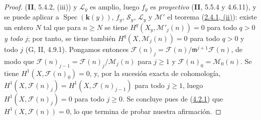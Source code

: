 \begin{proof}
(\textbf{II}, 5.4.2, (iii)) y $\mathcal L_y$ es amplio, luego $f_y$ es \emph{proyectivo}
(\textbf{II}, 5.5.4 y 4.6.11), y se puede aplicar a
$\operatorname{Spec}(\boldsymbol{k}(y))$, $f_y$, $\mathcal S_y$, $\mathcal L_y$ y
$\mathcal M'$ el teorema (\hyperref[III.2.4.1-fr]{2.4.1, (ii)}):
existe un entero $N$ tal que para $n\geq N$ se tiene
$H^q(X_y,\mathcal M'_j(n))=0$ para todo $q>0$ \emph{y todo} $j$; por tanto, se tiene
también $H^q(X,\mathcal M_j(n))=0$ para todo $q>0$ y todo $j$
(G, II, 4.9.1). Pongamos entonces
$\mathcal F(n)_j=\mathcal F(n)/\mathfrak m^{j+1}\mathcal F(n)$,
de modo que $\mathcal F(n)_{j-1}=\mathcal F(n)_j/\mathcal M_j(n)$ para
$j\geq1$ y $\mathcal F(n)_0=\mathcal M_0(n)$. Se tiene
$H^1(X,\mathcal F(n)_0)=0$, y, por la sucesión exacta de cohomología,
$H^1(X,\mathcal F(n)_j)=H^1(X,\mathcal F(n)_{j-1})$ para todo $j\geq1$,
luego $H^1(X,\mathcal F(n)_j)=0$ para todo $j\geq0$. Se concluye pues de
(\hyperref[III.4.2.1-fr]{4.2.1}) que $H^1(X,\mathcal F(n))=0$, lo que
termina de probar nuestra afirmación.


\end{proof}
